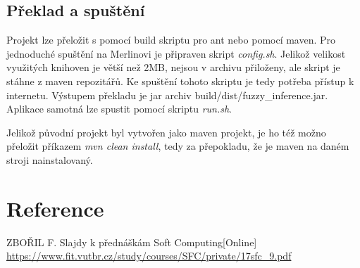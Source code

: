 \documentclass[12pt,a4paper,titlepage]{article}
\begin{document}
\subsection{Překlad a spuštění}
Projekt lze přeložit s pomocí build skriptu pro ant nebo pomocí maven. Pro jednoduché spuštění na Merlinovi je připraven skript \textit{config.sh}. Jelikož velikost využitých knihoven je větší než 2MB, nejsou v archivu přiloženy, ale skript je stáhne z maven repozitářů. Ke spuštění tohoto skriptu je tedy potřeba přístup k internetu. Výstupem překladu je jar archiv build/dist/fuzzy\_inference.jar. Aplikace samotná lze spustit pomocí skriptu \textit{run.sh}.

Jelikož původní projekt byl vytvořen jako maven projekt, je ho též možno přeložit příkazem \textit{mvn clean install}, tedy za přepokladu, že je maven na daném stroji nainstalovaný.


\section*{Reference}
\begin{enumerate}[label={[\arabic*]}]
\item ZBOŘIL F. Slajdy k přednáškám Soft Computing[Online] \\
     \href{https://www.fit.vutbr.cz/study/courses/SFC/private/17sfc\_9.pdf}
          {https://www.fit.vutbr.cz/study/courses/SFC/private/17sfc\_9.pdf}
     \label{prezentace}
\end{enumerate}
\end{document}
